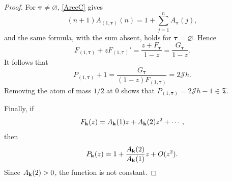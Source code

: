 \documentclass[10pt,a4paper]{amsart}
\begin{document}
\begin{proof}
For ${\boldsymbol\tau}\neq\varnothing$, \eqref{ArecC} gives
\[
(n+1)A_{(1,{\boldsymbol\tau})}(n)
=1+\sum_{j=1}^{n}A_{\boldsymbol\tau}(j),
\]
and the same formula, with the sum absent, holds for
${\boldsymbol\tau}=\varnothing$.  Hence
\begin{equation}\label{firstoneidentity}
F_{(1,{\boldsymbol\tau})}+zF_{(1,{\boldsymbol\tau})}'
=\frac{z+F_{\boldsymbol\tau}}{1-z}
=\frac{G_{\boldsymbol\tau}}{1-z}.
\end{equation}
It follows that
\[
P_{(1,{\boldsymbol\tau})}+1
=\frac{G_{\boldsymbol\tau}}{(1-z)F_{(1,{\boldsymbol\tau})}}
=2\mathcal{J}h.
\]
Removing the atom of mass $1/2$ at $0$ shows that
$P_{(1,{\boldsymbol\tau})}=2\mathcal{J}h-1\in\mathfrak{T}$.

Finally, if
\[
F_{\bf k}(z)=A_{\bf k}(1)z+A_{\bf k}(2)z^2+\cdots,
\]
then
\[
P_{\bf k}(z)=1+\frac{A_{\bf k}(2)}{A_{\bf k}(1)}z+O(z^2).
\]
Since $A_{\bf k}(2)>0$, the function is not constant.
\end{proof}
\end{document}
